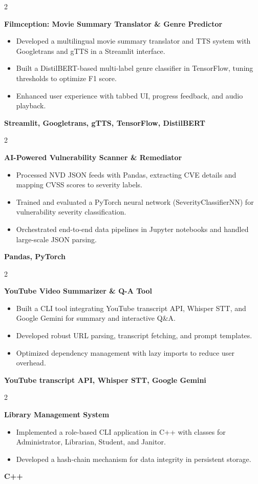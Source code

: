 \documentclass[10pt, letterpaper]{article}
\newenvironment{highlights}{
    \begin{itemize}[
        topsep=0.15cm,
        parsep=0.15cm,
        partopsep=0pt,
        itemsep=0.1cm,
        leftmargin=0.4cm + 10pt
    ]
}{
    \end{itemize}
}
\newenvironment{twocolentry}[2][]{
    \onecolentry
    \def\secondColumn{#2}
    \setcolumnwidth{\fill, 4.5cm}
    \begin{paracol}{2}
}{
    \switchcolumn \raggedleft \secondColumn
    \end{paracol}
    \endonecolentry
}
\begin{document}
\begin{twocolentry}{\textbf{Streamlit, Googletrans, gTTS, TensorFlow, DistilBERT}}
    \textbf{Filmception: Movie Summary Translator \& Genre Predictor}
    \begin{highlights}
        \item Developed a multilingual movie summary translator and TTS system with Googletrans and gTTS in a Streamlit interface.
        \item Built a DistilBERT-based multi-label genre classifier in TensorFlow, tuning thresholds to optimize F1 score.
        \item Enhanced user experience with tabbed UI, progress feedback, and audio playback.
    \end{highlights}
\end{twocolentry}

\begin{twocolentry}{\textbf{Pandas, PyTorch}}
    \textbf{AI-Powered Vulnerability Scanner \& Remediator}
    \begin{highlights}
        \item Processed NVD JSON feeds with Pandas, extracting CVE details and mapping CVSS scores to severity labels.
        \item Trained and evaluated a PyTorch neural network (SeverityClassifierNN) for vulnerability severity classification.
        \item Orchestrated end-to-end data pipelines in Jupyter notebooks and handled large-scale JSON parsing.
    \end{highlights}
\end{twocolentry}

\begin{twocolentry}{\textbf{YouTube transcript API, Whisper STT, Google Gemini}}
    \textbf{YouTube Video Summarizer \& Q-A Tool}
    \begin{highlights}
        \item Built a CLI tool integrating YouTube transcript API, Whisper STT, and Google Gemini for summary and interactive Q\&A.
        \item Developed robust URL parsing, transcript fetching, and prompt templates.
        \item Optimized dependency management with lazy imports to reduce user overhead.
    \end{highlights}
\end{twocolentry}

\begin{twocolentry}{\textbf{C++}}
    \textbf{Library Management System}
    \begin{highlights}
        \item Implemented a role-based CLI application in C++ with classes for Administrator, Librarian, Student, and Janitor.
        \item Developed a hash-chain mechanism for data integrity in persistent storage.
    \end{highlights}
\end{twocolentry}
\end{document}
